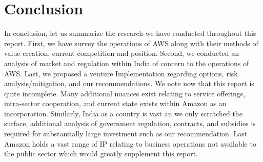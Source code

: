 \documentclass[a4paper, 12pt]{article}
\begin{document}
\section{Conclusion}
In conclusion, let us summarize the research we have conducted throughout this report. 
First, we have survey the operations of AWS along with their methods of value creation, current competition and position. 
Second, we conducted an analysis of market and regulation within India of concern to the operations of AWS. 
Last, we proposed a venture Implementation regarding options, risk analysis/mitigation, and our recommendations. 
We note now that this report is quite incomplete. 
Many additional nuances exist relating to service offerings, intra-sector cooperation, and current state exists within Amazon as an incorporation. 
Similarly, India as a country is vast an we only scratched the surface, additional analysis of government regulation, contracts, and subsidies is required for substantially large investment such as our recommendation.
Last Amazon holds a vast range of IP relating to business operations not available to the public sector which would greatly supplement this report.  

\newpage
{}
{}

\newpage
{}
\end{document}
